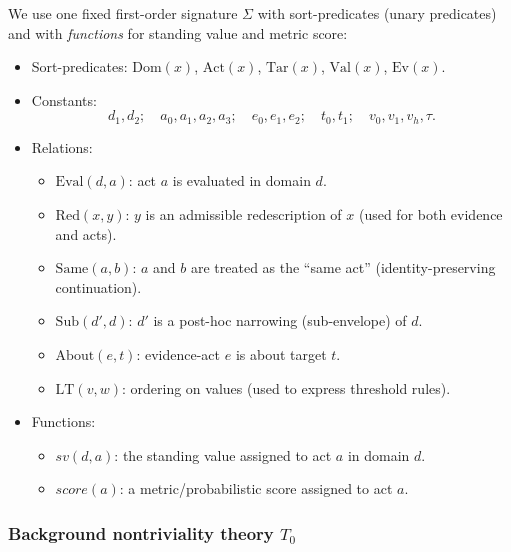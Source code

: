 \documentclass[12pt]{article}
\begin{document}
We use one fixed first-order signature $\Sigma$ with sort-predicates (unary predicates) and with \emph{functions} for standing value and metric score:
\begin{itemize}[leftmargin=2.2em]
\item Sort-predicates: $\mathrm{Dom}(x)$, $\mathrm{Act}(x)$, $\mathrm{Tar}(x)$, $\mathrm{Val}(x)$, $\mathrm{Ev}(x)$.
\item Constants:
\[
d_1,d_2;\quad a_0,a_1,a_2,a_3;\quad e_0,e_1,e_2;\quad t_0,t_1;\quad v_0,v_1,v_h,\tau.
\]
\item Relations:
  \begin{itemize}[leftmargin=2.2em]
  \item $\mathrm{Eval}(d,a)$: act $a$ is evaluated in domain $d$.
  \item $\mathrm{Red}(x,y)$: $y$ is an admissible redescription of $x$ (used for both evidence and acts).
  \item $\mathrm{Same}(a,b)$: $a$ and $b$ are treated as the ``same act'' (identity-preserving continuation).
  \item $\mathrm{Sub}(d',d)$: $d'$ is a post-hoc narrowing (sub-envelope) of $d$.
  \item $\mathrm{About}(e,t)$: evidence-act $e$ is about target $t$.
  \item $\mathrm{LT}(v,w)$: ordering on values (used to express threshold rules).
  \end{itemize}
\item Functions:
  \begin{itemize}[leftmargin=2.2em]
  \item $sv(d,a)$: the standing value assigned to act $a$ in domain $d$.
  \item $score(a)$: a metric/probabilistic score assigned to act $a$.
  \end{itemize}
\end{itemize}

\subsubsection{Background nontriviality theory \texorpdfstring{$T_0$}{T0}}
\label{app:T0}
\end{document}
